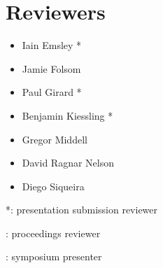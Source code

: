 \documentclass[final]{anthology-ch} %
\begin{document}
\section*{Reviewers}

\begin{itemize}
    \item Iain Emsley *
    \item Jamie Folsom \textbf{\textdagger}\textbf{\textdaggerdbl} 
    \item Paul Girard *\textbf{\textdaggerdbl} 
    \item Benjamin Kiessling *\textbf{\textdaggerdbl} 
    \item Gregor Middell \textbf{\textdagger}\textbf{\textdaggerdbl} 
    \item David Ragnar Nelson \textbf{\textdagger}\textbf{\textdaggerdbl}
    \item Diego Siqueira \textbf{\textdagger}
\end{itemize}

*: presentation submission reviewer

\textbf{\textdagger}:  proceedings reviewer

\textbf{\textdaggerdbl} : symposium presenter
\end{document}

